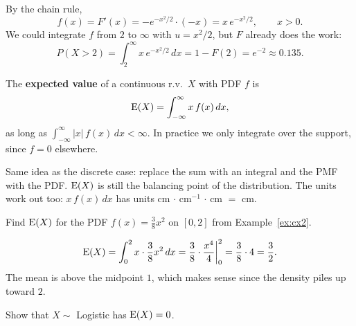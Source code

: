 \medskip

\begin{solution}
By the chain rule,
\medskip
\[
f(x) = F'(x) = -e^{-x^{2}/2} \cdot (-x) = x\,e^{-x^{2}/2}, \qquad x > 0.
\]
\medskip
We could integrate $f$ from $2$ to $\infty$ with $u = x^{2}/2$, but $F$ already does the work:
\medskip
\[
P(X > 2) = \int_{2}^{\infty} x\,e^{-x^{2}/2}\,dx = 1 - F(2) = e^{-2} \approx 0.135.
\]
\end{solution}

\bigskip

\begin{definition}\label{def:contE}
The \textbf{expected value} of a continuous r.v.\ $X$ with PDF $f$ is
\medskip
\[
\operatorname{E}(X) = \int_{-\infty}^{\infty} x\,f(x)\,dx,
\]
\medskip
as long as $\int_{-\infty}^{\infty} |x|\,f(x)\,dx < \infty$. In practice we only integrate over the support, since $f = 0$ elsewhere.
\end{definition}

\bigskip

\begin{intuition}
Same idea as the discrete case: replace the sum with an integral and the PMF with the PDF. $\operatorname{E}(X)$ is still the balancing point of the distribution. The units work out too: $x\,f(x)\,dx$ has units cm $\cdot$ cm$^{-1}$ $\cdot$ cm $=$ cm.
\end{intuition}

\bigskip

\begin{example}\label{ex:cx2mean}
Find $\operatorname{E}(X)$ for the PDF $f(x) = \tfrac{3}{8}x^{2}$ on $[0, 2]$ from Example~\ref{ex:cx2}.
\end{example}

\medskip

\begin{solution}
\medskip
\[
\operatorname{E}(X) = \int_{0}^{2} x \cdot \frac{3}{8}x^{2}\,dx = \frac{3}{8} \cdot \frac{x^{4}}{4}\bigg|_{0}^{2} = \frac{3}{8} \cdot 4 = \frac{3}{2}.
\]
\medskip
The mean is above the midpoint $1$, which makes sense since the density piles up toward $2$.
\end{solution}

\bigskip

\begin{example}
Show that $X \sim$ Logistic has $\operatorname{E}(X) = 0$.
\end{example}

\medskip

